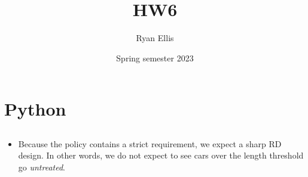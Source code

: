 \documentclass{article}
\title{HW6}
\author{Ryan Ellis}
\date{Spring semester 2023}
\begin{document}
  
\maketitle

\section{Python}
\subsection{}
\begin{itemize}
    \item Because the policy contains a strict requirement, we expect a sharp RD design. In other words, we do not expect to see cars over the length threshold go \textit{untreated}.
\end{itemize}

\subsection{}
\end{document}
